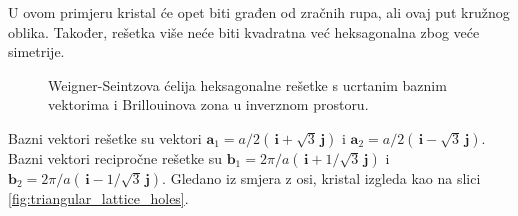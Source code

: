 \documentclass[utf8, seminar, numeric]{fer}
\begin{document}
U ovom primjeru kristal će opet biti građen od zračnih rupa, ali ovaj put
kružnog oblika. Također, rešetka više neće biti kvadratna već heksagonalna zbog
veće simetrije.

\begin{figure}[ht]
\centering
    \qquad
	\caption{Weigner-Seintzova ćelija heksagonalne rešetke s ucrtanim baznim
	vektorima i Brillouinova zona u inverznom prostoru.}
	\label{fig:triangular_lattice}
\end{figure}

Bazni vektori rešetke su vektori
${\mathbf{a}_1 = a/2 ( \, \mathbf{i} + \sqrt{3} \, \mathbf{j})}$ i
${\mathbf{a}_2 = a/2 ( \, \mathbf{i} - \sqrt{3} \, \mathbf{j})}$.
Bazni vektori recipročne rešetke su
${\mathbf{b}_1 = 2 \pi/a( \, \mathbf{i} + 1/\sqrt{3} \, \mathbf{j})}$ i
${\mathbf{b}_2 = 2 \pi/a( \, \mathbf{i} - 1/\sqrt{3} \, \mathbf{j})}$.
Gledano iz smjera z osi, kristal izgleda kao na slici
\ref{fig:triangular_lattice_holes}.
\end{document}
